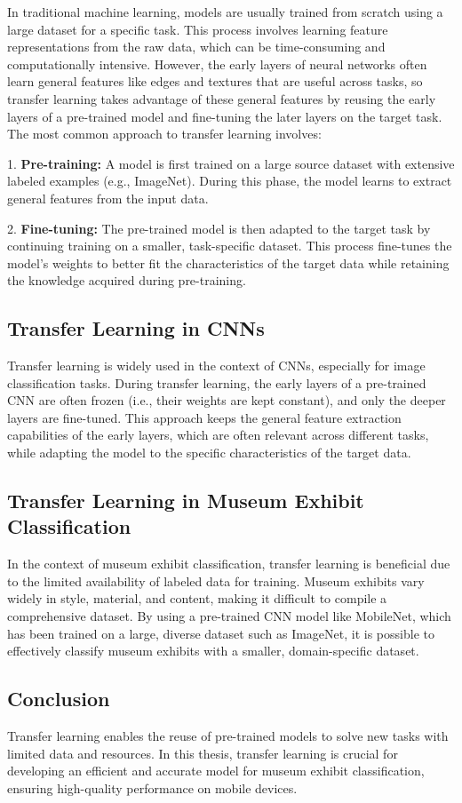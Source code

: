 In traditional machine learning, models are usually trained from scratch using a large dataset for a specific task. This process involves learning feature representations from the raw data, which can be time-consuming and computationally intensive. However, the early layers of neural networks often learn general features like edges and textures that are useful across tasks, so transfer learning takes advantage of these general features by reusing the early layers of a pre-trained model and fine-tuning the later layers on the target task. The most common approach to transfer learning involves:

1. \textbf{Pre-training:} A model is first trained on a large source dataset with extensive labeled examples (e.g., ImageNet). During this phase, the model learns to extract general features from the input data.

2. \textbf{Fine-tuning:} The pre-trained model is then adapted to the target task by continuing training on a smaller, task-specific dataset. This process fine-tunes the model's weights to better fit the characteristics of the target data while retaining the knowledge acquired during pre-training.

\subsection{Transfer Learning in CNNs}

Transfer learning is widely used in the context of CNNs, especially for image classification tasks. During transfer learning, the early layers of a pre-trained CNN are often frozen (i.e., their weights are kept constant), and only the deeper layers are fine-tuned. This approach keeps the general feature extraction capabilities of the early layers, which are often relevant across different tasks, while adapting the model to the specific characteristics of the target data.

\subsection{Transfer Learning in Museum Exhibit Classification}

In the context of museum exhibit classification, transfer learning is beneficial due to the limited availability of labeled data for training. Museum exhibits vary widely in style, material, and content, making it difficult to compile a comprehensive dataset. By using a pre-trained CNN model like MobileNet, which has been trained on a large, diverse dataset such as ImageNet, it is possible to effectively classify museum exhibits with a smaller, domain-specific dataset.

\subsection{Conclusion}

Transfer learning enables the reuse of pre-trained models to solve new tasks with limited data and resources. In this thesis, transfer learning is crucial for developing an efficient and accurate model for museum exhibit classification, ensuring high-quality performance on mobile devices.